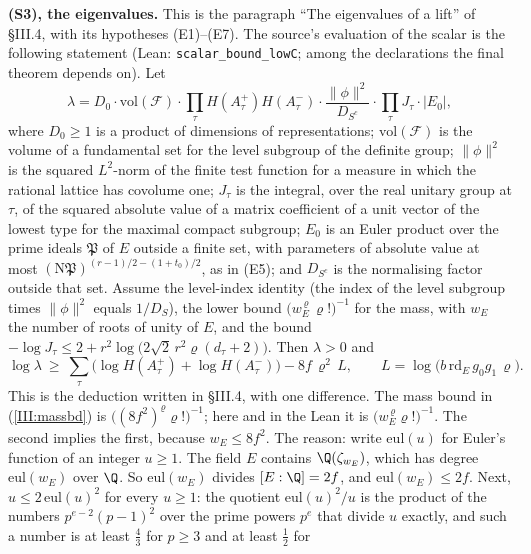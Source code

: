 \documentclass[11pt,letterpaper]{article}
\begin{document}
\textbf{(S3), the eigenvalues.} This is the paragraph ``The eigenvalues of a lift'' of \S III.4, with its
hypotheses (E1)--(E7). The source's evaluation of the scalar is the following statement (Lean:
\texttt{scalar\_bound\_lowC}; among the declarations the final theorem depends on). Let
\begin{equation}\label{D:291}
 \lambda=D_0\cdot\mathrm{vol}(\mathcal F)\cdot
 \prod_\tau H(A_\tau^+)H(A_\tau^-)\cdot\frac{\|\phi\|^2}{D_{S^c}}\cdot\prod_\tau J_\tau\cdot|E_0|,
\end{equation}
where $D_0\ge1$ is a product of dimensions of representations; $\mathrm{vol}(\mathcal F)$ is the volume
of a fundamental set for the level subgroup of the definite group; $\|\phi\|^2$ is the squared
$L^2$-norm of the finite test function for a measure in which the rational lattice has covolume one;
$J_\tau$ is the integral, over the real unitary group at $\tau$, of the squared absolute value of a
matrix coefficient of a unit vector of the lowest type for the maximal compact subgroup; $E_0$ is an
Euler product over the prime ideals $\mathfrak P$ of $E$ outside a finite set, with parameters of absolute value
at most $(\mathrm N\mathfrak P)^{(r-1)/2-(1+t_0)/2}$, as in (E5); and $D_{S^c}$ is the normalising factor
outside that set. Assume the level-index identity (the index of the level subgroup times $\|\phi\|^2$
equals $1/D_S$), the lower bound $\big(w_E^{\,\varrho}\,\varrho!\big)^{-1}$ for the mass, with $w_E$ the
number of roots of unity of $E$, and the bound
$-\log J_\tau\le2+r^2\log\big(2\sqrt2\,r^2\varrho(d_\tau+2)\big)$. Then $\lambda>0$ and
\begin{equation}\label{D:292}
 \log\lambda\ \ge\ \sum_\tau\big(\log H(A_\tau^+)+\log H(A_\tau^-)\big)-8f\,\varrho^2\,L,\qquad
 L=\log\big(b\,\mathrm{rd}_E\,g_0g_1\,\varrho\big).
\end{equation}
This is the deduction written in \S III.4, with one difference. The mass bound in (\ref{III:massbd}) is
$\big((8f^2)^{\varrho}\varrho!\big)^{-1}$; here and in the Lean it is
$\big(w_E^{\,\varrho}\varrho!\big)^{-1}$. The second implies the first, because $w_E\le8f^2$. The reason:
write $\mathrm{eul}(u)$ for Euler's function of an integer $u\ge1$. The field $E$ contains
$\Q(\zeta_{w_E})$, which has degree $\mathrm{eul}(w_E)$ over $\Q$. So $\mathrm{eul}(w_E)$ divides
$[E:\Q]=2f$, and $\mathrm{eul}(w_E)\le2f$. Next, $u\le2\,\mathrm{eul}(u)^2$ for every $u\ge1$: the
quotient $\mathrm{eul}(u)^2/u$ is the product of the numbers $p^{e-2}(p-1)^2$ over the prime powers $p^e$
that divide $u$ exactly, and such a number is at least $\frac43$ for $p\ge3$ and at least $\frac12$ for
\end{document}
